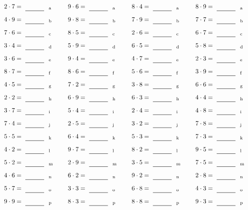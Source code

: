\documentclass
[
  draft    = true,
  fontsize = 11pt,
  parskip  = half-
]
{scrartcl}
\begin{document}
\par\vfill\par
\begin{align*}
    \pline{2\cdot7}&=\rline{a}
  & \pline{9\cdot6}&=\rline{a}
  & \pline{8\cdot4}&=\rline{a}
  & \pline{8\cdot9}&=\rline{a} \\[1ex]
    \pline{4\cdot9}&=\rline{b}
  & \pline{9\cdot8}&=\rline{b}
  & \pline{7\cdot9}&=\rline{b}
  & \pline{7\cdot7}&=\rline{b} \\[1ex]
    \pline{7\cdot6}&=\rline{c}
  & \pline{8\cdot5}&=\rline{c}
  & \pline{2\cdot6}&=\rline{c}
  & \pline{6\cdot7}&=\rline{c} \\[1ex]
    \pline{3\cdot4}&=\rline{d}
  & \pline{5\cdot9}&=\rline{d}
  & \pline{6\cdot5}&=\rline{d}
  & \pline{5\cdot8}&=\rline{d} \\[1ex]
    \pline{3\cdot6}&=\rline{e}
  & \pline{9\cdot4}&=\rline{e}
  & \pline{4\cdot7}&=\rline{e}
  & \pline{2\cdot3}&=\rline{e} \\[1ex]
    \pline{8\cdot7}&=\rline{f}
  & \pline{8\cdot6}&=\rline{f}
  & \pline{5\cdot6}&=\rline{f}
  & \pline{3\cdot9}&=\rline{f} \\[1ex]
    \pline{4\cdot5}&=\rline{g}
  & \pline{7\cdot2}&=\rline{g}
  & \pline{3\cdot8}&=\rline{g}
  & \pline{6\cdot6}&=\rline{g} \\[1ex]
    \pline{2\cdot2}&=\rline{h}
  & \pline{6\cdot9}&=\rline{h}
  & \pline{6\cdot3}&=\rline{h}
  & \pline{4\cdot4}&=\rline{h} \\[1ex]
    \pline{3\cdot7}&=\rline{i}
  & \pline{5\cdot4}&=\rline{i}
  & \pline{2\cdot4}&=\rline{i}
  & \pline{4\cdot8}&=\rline{i} \\[1ex]
    \pline{7\cdot4}&=\rline{j}
  & \pline{2\cdot5}&=\rline{j}
  & \pline{3\cdot2}&=\rline{j}
  & \pline{7\cdot8}&=\rline{j} \\[1ex]
    \pline{5\cdot5}&=\rline{k}
  & \pline{6\cdot4}&=\rline{k}
  & \pline{5\cdot3}&=\rline{k}
  & \pline{7\cdot3}&=\rline{k} \\[1ex]
    \pline{4\cdot2}&=\rline{l}
  & \pline{9\cdot7}&=\rline{l}
  & \pline{8\cdot2}&=\rline{l}
  & \pline{9\cdot5}&=\rline{l} \\[1ex]
    \pline{5\cdot2}&=\rline{m}
  & \pline{2\cdot9}&=\rline{m}
  & \pline{3\cdot5}&=\rline{m}
  & \pline{7\cdot5}&=\rline{m} \\[1ex]
    \pline{4\cdot6}&=\rline{n}
  & \pline{6\cdot2}&=\rline{n}
  & \pline{9\cdot2}&=\rline{n}
  & \pline{2\cdot8}&=\rline{n} \\[1ex]
    \pline{5\cdot7}&=\rline{o}
  & \pline{3\cdot3}&=\rline{o}
  & \pline{6\cdot8}&=\rline{o}
  & \pline{4\cdot3}&=\rline{o} \\[1ex]
    \pline{9\cdot9}&=\rline{p}
  & \pline{8\cdot3}&=\rline{p}
  & \pline{8\cdot8}&=\rline{p}
  & \pline{9\cdot3}&=\rline{p}
\end{align*}
\end{document}
